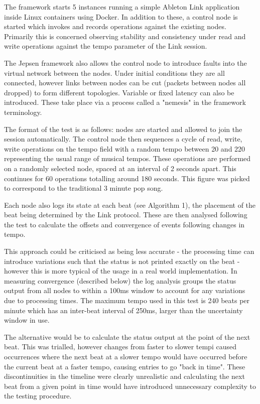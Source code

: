 \documentclass[11pt]{article} %
\theoremstyle{plain}
\theoremstyle{definition}
\begin{document}
The framework starts 5 instances running a simple Ableton Link application
inside Linux containers using Docker. In addition to these, a control node is
started which invokes and records operations against the existing nodes.
Primarily this is concerned observing stability and consistency under read and
write operations against the tempo parameter of the Link session.

The Jepsen framework also allows the control node to introduce faults into the
virtual network between the nodes. Under initial conditions they are all
connected, however links between nodes can be cut (packets between nodes all
dropped) to form different topologies. Variable or fixed latency can also be
introduced. These take place via a process called a "nemesis" in the framework
terminology.

The format of the test is as follows: nodes are started and allowed to join the
session automatically. The control node then sequences a cycle of read, write,
write operations on the tempo field with a random tempo between 20 and 220
representing the usual range of musical tempos. These operations are performed
on a randomly selected node, spaced at an interval of 2 seconds apart. This
continues for 60 operations totalling around 180 seconds. This figure was
picked to correspond to the traditional 3 minute pop song.

Each node also logs its state at each beat (see Algorithm 1), the placement of
the beat being determined by the Link protocol. These are then analysed
following the test to calculate the offsets and convergence of events following
changes in tempo.

This approach could be criticised as being less accurate - the processing time
can introduce variations such that the status is not printed exactly on the
beat - however this is more typical of the usage in a real world
implementation. In measuring convergence (described below) the log analysis
groups the status output from all nodes to within a 100ms window to account for
any variations due to processing times. The maximum tempo used in this test is
240 beats per minute which has an inter-beat interval of 250ms, larger than the
uncertainty window in use.

The alternative would be to calculate the status output at the point of the
next beat. This was trialled, however changes from faster to slower tempi
caused occurrences where the next beat at a slower tempo would have occurred
before the current beat at a faster tempo, causing entries to go "back in
time". These discontinuities in the timeline were clearly unrealistic and
calculating the next beat from a given point in time would have introduced
unnecessary complexity to the testing procedure.
\end{document}
